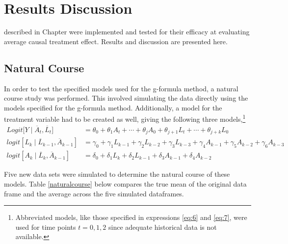 
\chapter{Results Discussion} \label{Results}

 described in Chapter \label{Methods} were implemented and tested for their efficacy at evaluating average causal treatment effect.  Results and discussion are presented here.  

\section{Natural Course} 
In order to test the specified models used for the g-formula method, a natural course study was performed.  This involved simulating the data directly using the models specified for the g-formula method.  Additionally, a model for the treatment variable had to be created as well, giving the following three models,\footnote{Abbreviated models, like those specified in expressions \ref{eq:6} and \ref{eq:7}, were used for time points $t=0,1,2$ since adequate historical data is not available.} 
\begin{align} 
Logit \big[Y \mid \overline{A}_t, \overline{L}_t \big] &= \theta_{0} + \theta_1 A_{t} + \cdots + \theta_j A_0 + \theta_{j+1} L_t + \cdots + \theta_{j+k} L_0  \\ 
logit[L_k \mid \overline{L}_{k-1}, \overline{A}_{k-1}] &= \gamma_0 + \gamma_1 L_{k-1} + \gamma_2 L_{k-2} + \gamma_3 L_{k-3}  + \gamma_4 A_{k-1} + \gamma_5 A_{k-2} + \gamma_6 A_{k-3} \\ 
logit[A_k \mid \overline{L}_{k}, \overline{A}_{k-1}] &= \delta_0 + \delta_1 L_{k} + \delta_2 L_{k-1} + \delta_3 A_{k-1} + \delta_4 A_{k-2} 
\end{align} 

Five new data sets were simulated to determine the natural course of these models.  Table \ref{naturalcourse} below compares the true mean of the original data frame and the average across the five simulated dataframes.  


